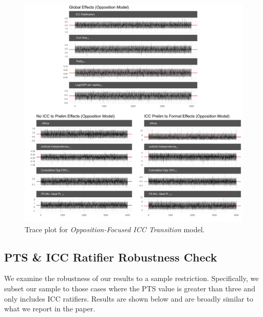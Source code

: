 \begin{figure}
    \centering
    \includegraphics[width=1\textwidth]{rebelCoefTrace.pdf}
    \caption{Trace plot for \emph{Opposition-Focused ICC Transition} model.}
    \label{fig:oppTrace}
\end{figure}
\FloatBarrier

\subsection*{PTS \& ICC Ratifier Robustness Check}


We examine the robustness of our results to a sample restriction. Specifically, we subset our sample to those cases where the PTS value is greater than three and only includes ICC ratifiers. Results are shown below and are broadly similar to what we report in the paper.

